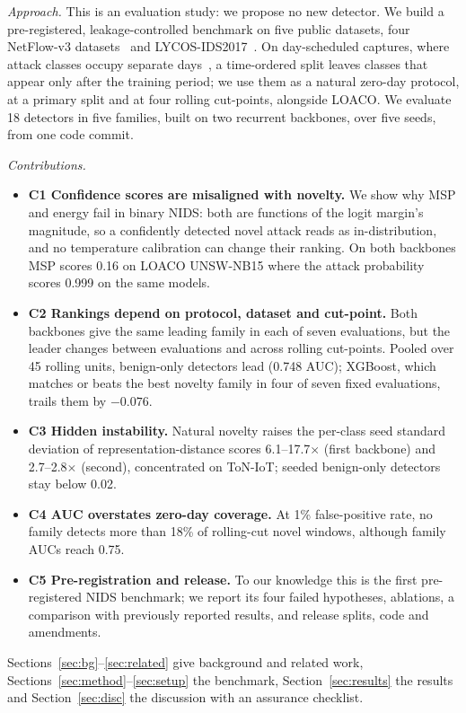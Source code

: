 \documentclass[conference]{IEEEtran}
\begin{document}
\emph{Approach.} This is an evaluation study: we propose no new detector. We build a pre-registered, leakage-controlled benchmark on five public datasets, four NetFlow-v3 datasets~\cite{luay2025} and LYCOS-IDS2017~\cite{rosay2021}. On day-scheduled captures, where attack classes occupy separate days~\cite{moczkodan2026}, a time-ordered split leaves classes that appear only after the training period; we use them as a natural zero-day protocol, at a primary split and at four rolling cut-points, alongside LOACO. We evaluate 18 detectors in five families, built on two recurrent backbones, over five seeds, from one code commit.

\emph{Contributions.}
\begin{itemize}
\item \textbf{C1 Confidence scores are misaligned with novelty.} We show why MSP and energy fail in binary NIDS: both are functions of the logit margin's magnitude, so a confidently detected novel attack reads as in-distribution, and no temperature calibration can change their ranking. On both backbones MSP scores 0.16 on LOACO UNSW-NB15 where the attack probability scores 0.999 on the same models.
\item \textbf{C2 Rankings depend on protocol, dataset and cut-point.} Both backbones give the same leading family in each of seven evaluations, but the leader changes between evaluations and across rolling cut-points. Pooled over 45 rolling units, benign-only detectors lead (0.748 AUC); XGBoost, which matches or beats the best novelty family in four of seven fixed evaluations, trails them by $-0.076$.
\item \textbf{C3 Hidden instability.} Natural novelty raises the per-class seed standard deviation of representation-distance scores 6.1--17.7$\times$ (first backbone) and 2.7--2.8$\times$ (second), concentrated on ToN-IoT; seeded benign-only detectors stay below 0.02.
\item \textbf{C4 AUC overstates zero-day coverage.} At 1\% false-positive rate, no family detects more than 18\% of rolling-cut novel windows, although family AUCs reach 0.75.
\item \textbf{C5 Pre-registration and release.} To our knowledge this is the first pre-registered NIDS benchmark; we report its four failed hypotheses, ablations, a comparison with previously reported results, and release splits, code and amendments.
\end{itemize}
Sections~\ref{sec:bg}--\ref{sec:related} give background and related work, Sections~\ref{sec:method}--\ref{sec:setup} the benchmark, Section~\ref{sec:results} the results and Section~\ref{sec:disc} the discussion with an assurance checklist.
\end{document}
